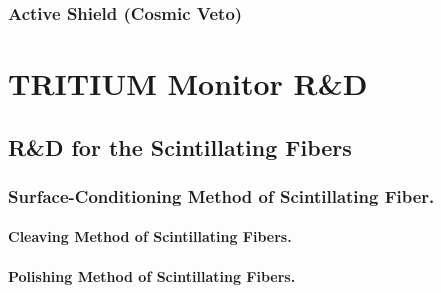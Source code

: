 \documentclass[12pt,a4paper]{book}
\begin{document}
		\subsection{Active Shield (Cosmic Veto)}\label{subsec:SetUpActiveShield}
		
		\newpage
					
\chapter{TRITIUM Monitor R\&D}\label{chap:ResearchandDevelopment}
	
	
	\section{R\&D for the Scintillating Fibers}\label{sec:CharacterizationScintillatingFibers}
	
		
		\subsection{Surface-Conditioning Method of Scintillating Fiber.}\label{subsec:SurfaceConditioningProcess}
		
				
			\subsubsection{Cleaving Method of Scintillating Fibers.}\label{subsubsec:CleavingProcess}
			
			
			\subsubsection{Polishing Method of Scintillating Fibers.}\label{subsubsec:PolishingProcess}
			
			
\end{document}
